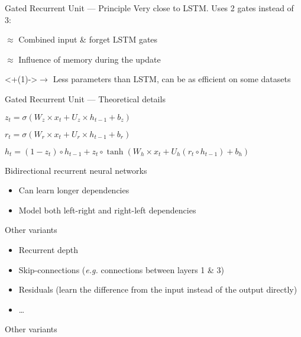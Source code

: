 \begin{frame}{Gated Recurrent Unit --- Principle}
  Very close to LSTM. Uses 2 gates instead of 3:
  \begin{description}[<+(1)->]
    \item[Update gate] $\approx$ Combined input \& forget LSTM gates
    \item[Reset gate] $\approx$ Influence of memory during the update
  \end{description}
  \onslide<+(1)->{$\rightarrow$ Less parameters than LSTM, can be as efficient on some datasets}
\end{frame}

\begin{frame}{Gated Recurrent Unit --- Theoretical details}
  \begin{description}[<+->]
    \item[Update gate] $z_t = \sigma (W_z \times x_t + U_z \times h_{t - 1} + b_z)$
    \item[Reset gate] $r_t = \sigma (W_r \times x_t + U_r \times h_{t - 1} + b_r)$
    \item[Output] $h_t = (1 - z_t) \circ h_{t - 1} + z_t \circ \tanh(W_h \times x_t + U_h (r_t \circ h_{t - 1}) + b_h)$
  \end{description}
\end{frame}

\begin{frame}{Bidirectional recurrent neural networks}
  \begin{itemize}[<+(1)->]
    \item Can learn longer dependencies
    \item Model both left-right and right-left dependencies
  \end{itemize}
\end{frame}

\begin{frame}{Other variants}
  \begin{itemize}[<+->]
    \item Recurrent depth
    \item Skip-connections (\emph{e.g.} connections between layers 1 \& 3)
    \item Residuals (learn the difference from the input instead of the output directly)
    \item …
  \end{itemize}
\end{frame}

\begin{frame}{Other variants}
\end{frame}
